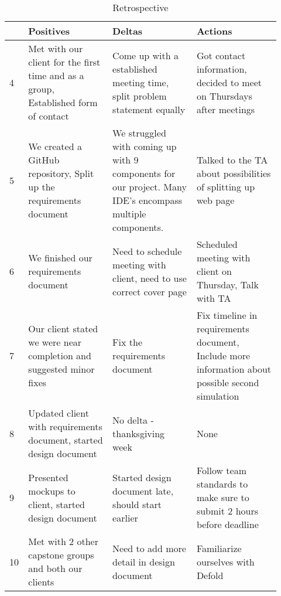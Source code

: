 \begin{table}[H]
  \centering
  \caption{Retrospective}
  \label{my-label}
  \begin{tabular}{|p{0.02\linewidth}|p{0.3\linewidth}|p{0.3\linewidth}|p{0.3\linewidth}|}
    \hline
    \textbf{ } & \textbf{Positives} & \textbf{Deltas} & \textbf{Actions} \\
    \hline

    4 & 
    Met with our client for the first time and as a group, Established form of contact & 
    Come up with a established meeting time, split problem statement equally & 
    Got contact information, decided to meet on Thursdays after meetings\\
    \hline
    5 & 
    We created a GitHub repository, Split up the requirements document  & 
    We struggled with coming up with 9 components for our project. Many IDE's encompass multiple components. & 
    Talked to the TA about possibilities of splitting up web page \\
    \hline
    6 & 
    We finished our requirements document  & 
    Need to schedule meeting with client, need to use correct cover page & 
    Scheduled meeting with client on Thursday, Talk with TA \\
    \hline
    7 & 
    Our client stated we were near completion and suggested minor fixes & 
    Fix the requirements document  & 
    Fix timeline in requirements document, Include more information about possible second simulation \\
    \hline
    8 & 
    Updated client with requirements document, started design document & 
    No delta - thanksgiving week & 
    None \\
    \hline
    9 & 
    Presented mockups to client, started design document & 
    Started design document late, should start earlier & 
    Follow team standards to make sure to submit 2 hours before deadline\\
    \hline
    10 & 
    Met with 2 other capstone groups and both our clients & 
    Need to add more detail in design document & 
    Familiarize ourselves with Defold \\
    \hline
    

  \end{tabular}
\end{table}